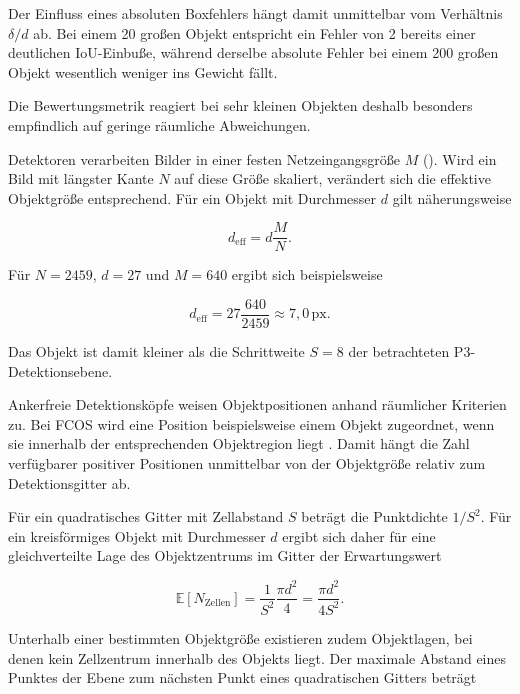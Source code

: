 Der Einfluss eines absoluten Boxfehlers hängt damit unmittelbar vom Verhältnis $\delta/d$ ab. Bei einem 20\px{} großen Objekt entspricht ein Fehler von 2\px{} bereits einer deutlichen IoU-Einbuße, während derselbe absolute Fehler bei einem 200\px{} großen Objekt wesentlich weniger ins Gewicht fällt.

Die Bewertungsmetrik reagiert bei sehr kleinen Objekten deshalb besonders empfindlich auf geringe räumliche Abweichungen.

Detektoren verarbeiten Bilder in einer festen Netzeingangsgröße $M$ (). Wird ein Bild mit längster Kante $N$ auf diese Größe skaliert, verändert sich die effektive Objektgröße entsprechend. Für ein Objekt mit Durchmesser $d$ gilt näherungsweise

\begin{equation}
d_{\mathrm{eff}}
=
d\frac{M}{N}.
\label{eq:deff}
\end{equation}

Für $N=2459$, $d=27$\px{} und $M=640$ ergibt sich beispielsweise

\begin{equation}
d_{\mathrm{eff}}
=
27\frac{640}{2459}
\approx
7{,}0\,\mathrm{px}.
\end{equation}

Das Objekt ist damit kleiner als die Schrittweite $S=8$ der betrachteten P3-Detektionsebene.

Ankerfreie Detektionsköpfe weisen Objektpositionen anhand räumlicher Kriterien zu. Bei FCOS wird eine Position beispielsweise einem Objekt zugeordnet, wenn sie innerhalb der entsprechenden Objektregion liegt \parencite{tian2019fcos}. Damit hängt die Zahl verfügbarer positiver Positionen unmittelbar von der Objektgröße relativ zum Detektionsgitter ab.

Für ein quadratisches Gitter mit Zellabstand $S$ beträgt die Punktdichte $1/S^2$. Für ein kreisförmiges Objekt mit Durchmesser $d$ ergibt sich daher für eine gleichverteilte Lage des Objektzentrums im Gitter der Erwartungswert

\begin{equation}
\mathbb{E}[N_{\mathrm{Zellen}}]
=
\frac{1}{S^2}
\frac{\pi d^2}{4}
=
\frac{\pi d^2}{4S^2}.
\label{eq:zellen}
\end{equation}

Unterhalb einer bestimmten Objektgröße existieren zudem Objektlagen, bei denen kein Zellzentrum innerhalb des Objekts liegt. Der maximale Abstand eines Punktes der Ebene zum nächsten Punkt eines quadratischen Gitters beträgt

